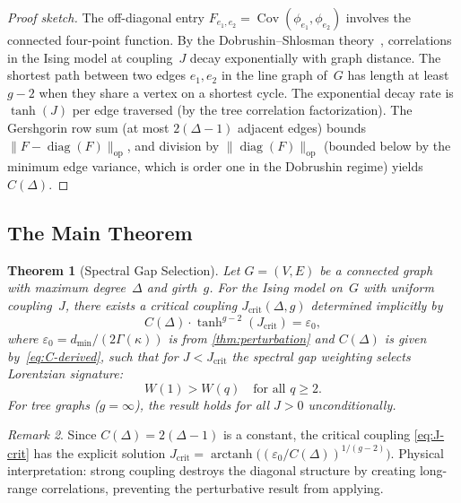 \documentclass[11pt]{article}
\newtheorem{theorem}{Theorem}[section]
\theoremstyle{definition}
\theoremstyle{remark}
\newtheorem{remark}[theorem]{Remark}
\begin{document}
\begin{proof}[Proof sketch]
The off-diagonal entry $F_{e_1, e_2} = \operatorname{Cov}(\phi_{e_1},
\phi_{e_2})$ involves the connected four-point function. By the
Dobrushin--Shlosman theory~\cite{Dobrushin1985}, correlations in the Ising
model at coupling~$J$ decay exponentially with graph distance. The shortest
path between two edges $e_1, e_2$ in the line graph of~$G$ has length at
least $g - 2$ when they share a vertex on a shortest cycle. The exponential
decay rate is $\tanh(J)$ per edge traversed (by the tree correlation
factorization). The Gershgorin row sum (at most $2(\Delta - 1)$ adjacent edges)
bounds $\|F - \operatorname{diag}(F)\|_{\mathrm{op}}$, and division by
$\|\operatorname{diag}(F)\|_{\mathrm{op}}$ (bounded below by the minimum
edge variance, which is order one in the Dobrushin regime) yields~$C(\Delta)$.
\end{proof}

\subsection{The Main Theorem}

\begin{theorem}[Spectral Gap Selection]
\label{thm:main}
Let $G = (V, E)$ be a connected graph with maximum degree~$\Delta$ and
girth~$g$. For the Ising model on~$G$ with uniform coupling~$J$, there exists
a critical coupling $J_{\mathrm{crit}}(\Delta, g)$ determined implicitly by
\begin{equation}
  C(\Delta) \cdot \tanh^{g-2}(J_{\mathrm{crit}})
  = \varepsilon_0,
  \label{eq:J-crit}
\end{equation}
where $\varepsilon_0 = d_{\min}/(2\Gamma(\kappa))$ is from \cref{thm:perturbation} and
$C(\Delta)$ is given by~\eqref{eq:C-derived}, such that
for $J < J_{\mathrm{crit}}$ the spectral gap weighting selects Lorentzian
signature:
\begin{equation}
  W(1) > W(q) \quad \text{for all } q \geq 2.
  \label{eq:main-selection}
\end{equation}
For tree graphs ($g = \infty$), the result holds for all $J > 0$
unconditionally.
\end{theorem}

\begin{remark}
Since $C(\Delta) = 2(\Delta - 1)$ is a constant, the critical coupling
\eqref{eq:J-crit} has the explicit solution
$J_{\mathrm{crit}} = \operatorname{arctanh}\bigl((\varepsilon_0 / C(\Delta))^{1/(g-2)}\bigr)$.
Physical interpretation: strong coupling destroys the
diagonal structure by creating long-range correlations, preventing the
perturbative result from applying.
\end{remark}
\end{document}
